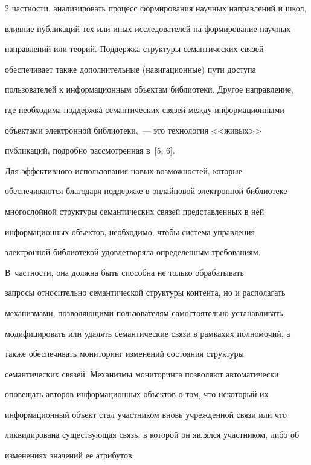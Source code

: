 \begin{multicols}{2}
частности, анализировать процесс формирования научных направлений и школ, 


влияние публикаций тех или иных исследователей на формирование научных 


направлений или теорий. Поддержка структуры семантических связей 


обеспечивает также дополнительные (навигационные) пути доступа 


пользователей к информационным объектам библиотеки. Другое направление, 


где необходима поддержка семантических связей между информационными 


объектами электронной биб\-лио\-те\-ки,~--- это технология <<живых>> 


публикаций, подробно рассмотренная в~[5, 6]. 


     


     Для эффективного использования новых возможностей, которые 


обеспечиваются благодаря под\-держ\-ке в онлайновой электронной \mbox{библиотеке} 


многослойной структуры семантических связей представленных в ней 


информационных объектов, необходимо, чтобы система управления 


электронной библиотекой удовлетворяла определенным требованиям. 


     В~част\-ности, она должна быть способна не только обрабатывать 


запросы относительно семантической структуры контента, но и располагать 


механизмами, позволяющими пользователям самостоятельно устанавливать, 


модифицировать или удалять семантические связи в рамках\linebreak  их полномочий, а 


также обеспечивать мониторинг измене\-ний состояния структуры 


семантических связей. Механизмы мониторинга позволяют автоматически 


оповещать авторов информационных объектов о том, что некоторый их 


информационный объект стал участником вновь учрежденной связи или что 


ликвидирована существующая связь, в которой он являлся участником, либо об 


изменениях значений ее атрибутов. 



\end{multicols}
